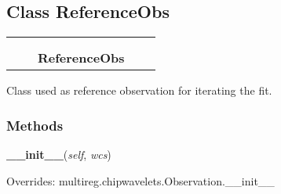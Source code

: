 

\subsection{Class ReferenceObs}

    \label{multireg:chipwavelets:ReferenceObs}
\begin{tabular}{cccccc}
\multicolumn{2}{r}{\settowidth{\BCL}{multireg.chipwavelets.Observation}\multirow{2}{\BCL}{multireg.chipwavelets.Observation}}
&&
  \\\cline{3-3}
  &&\multicolumn{1}{c|}{}
&&
  \\
&&\multicolumn{2}{l}{\textbf{ReferenceObs}}
\end{tabular}

Class used as reference observation for iterating the fit.



  \subsubsection{Methods}

    \label{multireg:chipwavelets:ReferenceObs:__init__}
    \vspace{0.5ex}

    \begin{boxedminipage}{\textwidth}

    \raggedright \textbf{\_\_init\_\_}(\textit{self}, \textit{wcs})

      Overrides: multireg.chipwavelets.Observation.\_\_init\_\_

    \end{boxedminipage}

    \label{multireg:chipwavelets:ReferenceObs:addChip}
    \vspace{0.5ex}


